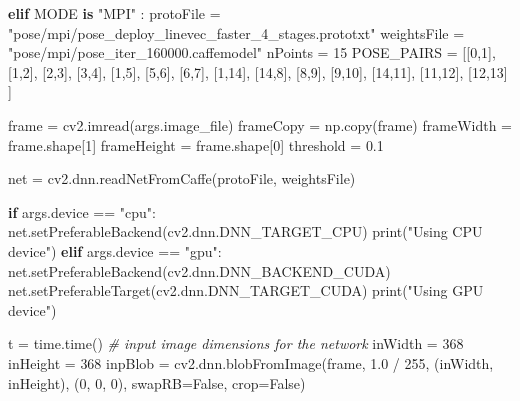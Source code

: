 \documentclass[
  12pt,
  a4paper,
]{article}
\newenvironment{Shaded}{}{}
\newcommand{\BuiltInTok}[1]{#1}
\newcommand{\CommentTok}[1]{\textcolor[rgb]{0.38,0.63,0.69}{\textit{#1}}}
\newcommand{\ControlFlowTok}[1]{\textcolor[rgb]{0.00,0.44,0.13}{\textbf{#1}}}
\newcommand{\DecValTok}[1]{\textcolor[rgb]{0.25,0.63,0.44}{#1}}
\newcommand{\FloatTok}[1]{\textcolor[rgb]{0.25,0.63,0.44}{#1}}
\newcommand{\KeywordTok}[1]{\textcolor[rgb]{0.00,0.44,0.13}{\textbf{#1}}}
\newcommand{\NormalTok}[1]{#1}
\newcommand{\OperatorTok}[1]{\textcolor[rgb]{0.40,0.40,0.40}{#1}}
\newcommand{\StringTok}[1]{\textcolor[rgb]{0.25,0.44,0.63}{#1}}
\newcommand{\VariableTok}[1]{\textcolor[rgb]{0.10,0.09,0.49}{#1}}
\begin{document}
\begin{Shaded}
\begin{Highlighting}[numbers=left,,]
\ControlFlowTok{elif}\NormalTok{ MODE }\KeywordTok{is} \StringTok{"MPI"}\NormalTok{ :}
\NormalTok{    protoFile }\OperatorTok{=} \StringTok{"pose/mpi/pose\_deploy\_linevec\_faster\_4\_stages.prototxt"}
\NormalTok{    weightsFile }\OperatorTok{=} \StringTok{"pose/mpi/pose\_iter\_160000.caffemodel"}
\NormalTok{    nPoints }\OperatorTok{=} \DecValTok{15}
\NormalTok{    POSE\_PAIRS }\OperatorTok{=}\NormalTok{ [[}\DecValTok{0}\NormalTok{,}\DecValTok{1}\NormalTok{], [}\DecValTok{1}\NormalTok{,}\DecValTok{2}\NormalTok{], [}\DecValTok{2}\NormalTok{,}\DecValTok{3}\NormalTok{], [}\DecValTok{3}\NormalTok{,}\DecValTok{4}\NormalTok{], [}\DecValTok{1}\NormalTok{,}\DecValTok{5}\NormalTok{], [}\DecValTok{5}\NormalTok{,}\DecValTok{6}\NormalTok{], [}\DecValTok{6}\NormalTok{,}\DecValTok{7}\NormalTok{], [}\DecValTok{1}\NormalTok{,}\DecValTok{14}\NormalTok{], [}\DecValTok{14}\NormalTok{,}\DecValTok{8}\NormalTok{], [}\DecValTok{8}\NormalTok{,}\DecValTok{9}\NormalTok{], [}\DecValTok{9}\NormalTok{,}\DecValTok{10}\NormalTok{], [}\DecValTok{14}\NormalTok{,}\DecValTok{11}\NormalTok{], [}\DecValTok{11}\NormalTok{,}\DecValTok{12}\NormalTok{], [}\DecValTok{12}\NormalTok{,}\DecValTok{13}\NormalTok{] ]}


\NormalTok{frame }\OperatorTok{=}\NormalTok{ cv2.imread(args.image\_file)}
\NormalTok{frameCopy }\OperatorTok{=}\NormalTok{ np.copy(frame)}
\NormalTok{frameWidth }\OperatorTok{=}\NormalTok{ frame.shape[}\DecValTok{1}\NormalTok{]}
\NormalTok{frameHeight }\OperatorTok{=}\NormalTok{ frame.shape[}\DecValTok{0}\NormalTok{]}
\NormalTok{threshold }\OperatorTok{=} \FloatTok{0.1}

\NormalTok{net }\OperatorTok{=}\NormalTok{ cv2.dnn.readNetFromCaffe(protoFile, weightsFile)}

\ControlFlowTok{if}\NormalTok{ args.device }\OperatorTok{==} \StringTok{"cpu"}\NormalTok{:}
\NormalTok{    net.setPreferableBackend(cv2.dnn.DNN\_TARGET\_CPU)}
    \BuiltInTok{print}\NormalTok{(}\StringTok{"Using CPU device"}\NormalTok{)}
\ControlFlowTok{elif}\NormalTok{ args.device }\OperatorTok{==} \StringTok{"gpu"}\NormalTok{:}
\NormalTok{    net.setPreferableBackend(cv2.dnn.DNN\_BACKEND\_CUDA)}
\NormalTok{    net.setPreferableTarget(cv2.dnn.DNN\_TARGET\_CUDA)}
    \BuiltInTok{print}\NormalTok{(}\StringTok{"Using GPU device"}\NormalTok{)}

\NormalTok{t }\OperatorTok{=}\NormalTok{ time.time()}
\CommentTok{\# input image dimensions for the network}
\NormalTok{inWidth }\OperatorTok{=} \DecValTok{368}
\NormalTok{inHeight }\OperatorTok{=} \DecValTok{368}
\NormalTok{inpBlob }\OperatorTok{=}\NormalTok{ cv2.dnn.blobFromImage(frame, }\FloatTok{1.0} \OperatorTok{/} \DecValTok{255}\NormalTok{, (inWidth, inHeight),}
\NormalTok{                          (}\DecValTok{0}\NormalTok{, }\DecValTok{0}\NormalTok{, }\DecValTok{0}\NormalTok{), swapRB}\OperatorTok{=}\VariableTok{False}\NormalTok{, crop}\OperatorTok{=}\VariableTok{False}\NormalTok{)}


\end{Highlighting}
\end{Shaded}
\end{document}
